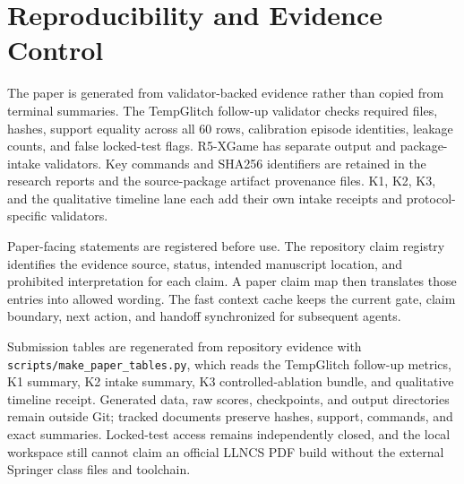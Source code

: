 \section{Reproducibility and Evidence Control}
\label{sec:reproducibility}

The paper is generated from validator-backed evidence rather than copied from terminal summaries.
The TempGlitch follow-up validator checks required files, hashes, support equality across all 60
rows, calibration episode identities, leakage counts, and false locked-test flags. R5-XGame has
separate output and package-intake validators. Key commands and SHA256 identifiers are retained in
the research reports and the source-package artifact provenance files. K1, K2, K3, and the
qualitative timeline lane each add their own intake receipts and protocol-specific validators.

Paper-facing statements are registered before use. The repository claim registry identifies the
evidence source, status, intended manuscript location, and prohibited interpretation for each
claim. A paper claim map then translates those entries into allowed wording. The fast context cache
keeps the current gate, claim boundary, next action, and handoff synchronized for subsequent
agents.

Submission tables are regenerated from repository evidence with
\texttt{scripts/make\_paper\_tables.py}, which reads the TempGlitch follow-up metrics, K1 summary,
K2 intake summary, K3 controlled-ablation bundle, and qualitative timeline receipt. Generated
data, raw scores, checkpoints, and output directories remain outside Git; tracked documents
preserve hashes, support, commands, and exact summaries. Locked-test access remains independently
closed, and the local workspace still cannot claim an official LLNCS PDF build without the
external Springer class files and toolchain.
